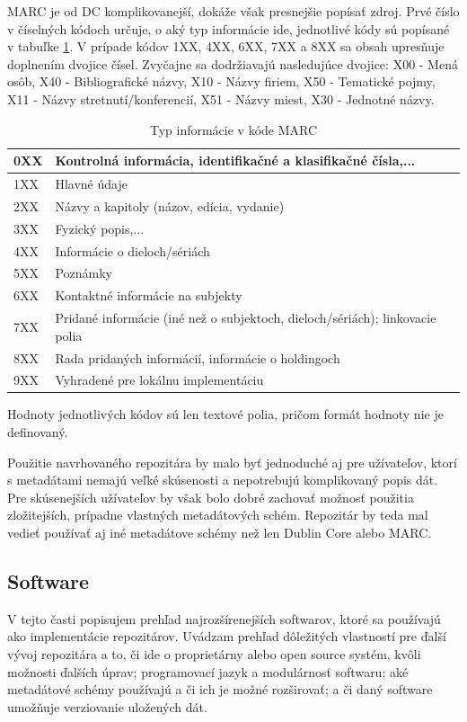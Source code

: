 \documentclass[thesis=M,slovak]{FITthesis}[2013/05/06]
\begin{document}
MARC je od DC komplikovanejší, dokáže však presnejšie popísať zdroj.
Prvé číslo v číselných kódoch určuje, o aký typ informácie ide, jednotlivé kódy sú popísané v tabuľke \ref{tab:marc}. V prípade kódov 1XX, 4XX, 6XX, 7XX a 8XX sa obsah upresňuje doplnením dvojice čísel. Zvyčajne sa dodržiavajú nasledujúce dvojice: X00 - Mená osôb, X40 - Bibliografické názvy, X10 - Názvy firiem, X50 - Tematické pojmy, X11 - Názvy stretnutí/konferencií, X51 - Názvy miest, X30 - Jednotné názvy.

\begin{table}[!htbp]\centering
 	\caption[MARC]{Typ informácie v kóde MARC}\label{tab:marc}
\begin{tabularx}{\textwidth}{|l|X|} \hline
0XX	& Kontrolná informácia, identifikačné a klasifikačné čísla,... \\ \hline
1XX	& Hlavné údaje \\ \hline
2XX	& Názvy a kapitoly (názov, edícia, vydanie) \\ \hline
3XX	& Fyzický popis,... \\ \hline
4XX	& Informácie o dieloch/sériách \\ \hline
5XX	& Poznámky \\ \hline
6XX	& Kontaktné informácie na subjekty \\ \hline
7XX	& Pridané informácie (iné než o subjektoch, dieloch/sériách); linkovacie polia \\ \hline
8XX	& Rada pridaných informácií, informácie o holdingoch \\ \hline
9XX	& Vyhradené pre lokálnu implementáciu \\ \hline
\end{tabularx}
\end{table}

Hodnoty jednotlivých kódov sú len textové polia, pričom formát hodnoty nie je definovaný.

Použitie navrhovaného repozitára by malo byť jednoduché aj pre užívateľov, ktorí s metadátami nemajú veľké skúsenosti a nepotrebujú komplikovaný popis dát. Pre skúsenejších užívateľov by však bolo dobré zachovať možnosť použitia zložitejších, prípadne vlastných metadátových schém. Repozitár by teda mal vedieť používať aj iné metadátove schémy než len Dublin Core alebo MARC.

\subsection{Software}
V tejto časti popisujem prehľad najrozšírenejších softwarov, ktoré sa používajú ako implementácie repozitárov. Uvádzam prehľad dôležitých vlastností pre ďalší vývoj repozitára a to, či ide o proprietárny alebo open source systém, kvôli možnosti ďalších úprav; programovací jazyk a modulárnosť softwaru; aké metadátové schémy používajú a či ich je možné rozširovať; a či daný software umožňuje verziovanie uložených dát.
\end{document}
